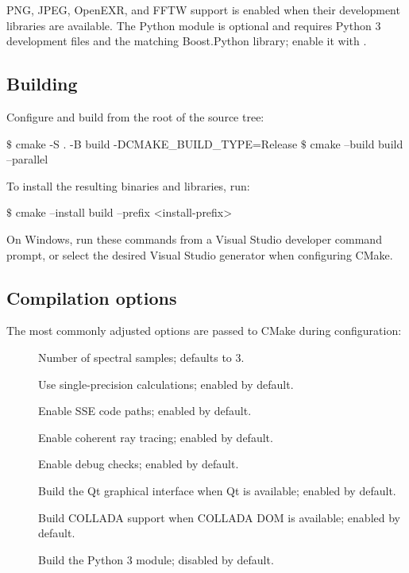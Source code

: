 PNG, JPEG, OpenEXR, and FFTW support is enabled when their development libraries are
available. The Python module is optional and requires Python 3 development files and
the matching Boost.Python library; enable it with .

\subsection{Building}
Configure and build from the root of the source tree:
\begin{shell}
$\texttt{\$}$ cmake -S . -B build -DCMAKE_BUILD_TYPE=Release
$\texttt{\$}$ cmake --build build --parallel
\end{shell}
To install the resulting binaries and libraries, run:
\begin{shell}
$\texttt{\$}$ cmake --install build --prefix <install-prefix>
\end{shell}
On Windows, run these commands from a Visual Studio developer command prompt, or
select the desired Visual Studio generator when configuring CMake.

\subsection{Compilation options}
\label{sec:compiling-flags}
The most commonly adjusted options are passed to CMake during configuration:
\begin{description}
\item[] Number of spectral samples; defaults to 3.
\item[] Use single-precision calculations; enabled by default.
\item[] Enable SSE code paths; enabled by default.
\item[] Enable coherent ray tracing; enabled by default.
\item[] Enable debug checks; enabled by default.
\item[] Build the Qt graphical interface when Qt is available; enabled by default.
\item[] Build COLLADA support when COLLADA DOM is available; enabled by default.
\item[] Build the Python 3 module; disabled by default.
\end{description}
